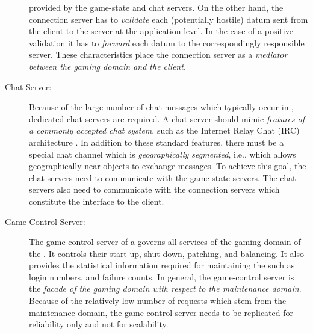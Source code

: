 \documentclass[a4paper, 10pt]{book}
\begin{document}
\begin{description}
                    provided by the game-state and chat servers. On the other hand, the
                    connection server has to \emph{validate} each (potentially hostile) 
                    datum sent from the
                    client to the server at the application level. In the case of a
                    positive validation it has to \emph{forward} each datum to the
                    correspondingly responsible server.
                    These characteristics place the connection server as a \emph{mediator
                    \cite{ghjv95} between the gaming domain and the client}. 
                \item[Chat Server:] Because of the large number of chat messages which
                    typically occur in \MMORGS, dedicated chat servers are required. A
                    chat server should mimic \emph{features of a commonly accepted chat
                    system}, such as the Internet Relay Chat (IRC) architecture
                    \cite{RFC1459,RFC2810,RFC2811,RFC2812,RFC2813}.
                    In addition to these standard features, there must be a special chat
                    channel which is \emph{geographically segmented}, i.e., which allows
                    geographically near objects to exchange messages.
                    To achieve this goal, the chat servers need to communicate with the
                    game-state servers. The chat servers also need to communicate with
                    the connection servers which constitute the interface to the client.
                \item[Game-Control Server:] The game-control server of a \MMORG
                    governs all services of the gaming domain of the \MMORG. It controls
                    their start-up, shut-down, patching, and balancing. It also provides
                    the statistical information required for maintaining the \MMORG
                    such as login numbers, and failure counts.
                    In general, the game-control server is the \emph{facade
                    \cite{ghjv95} of the gaming domain with respect to the
                    maintenance domain}.  
                    Because of the relatively low number of requests which stem from the
                    maintenance domain, the game-control server needs to be replicated
                    for reliability only and not for scalability.
            \end{description}
\end{document}
